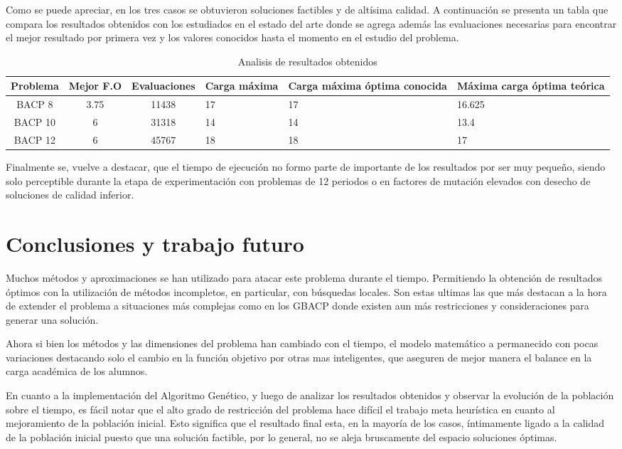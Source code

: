 \documentclass[letter, 10pt]{article}
\begin{document}
Como se puede apreciar, en los tres casos se obtuvieron soluciones factibles y
de altísima calidad.  A continuación se presenta un tabla que compara los resultados
obtenidos con los estudiados en el estado del arte donde se agrega además las
evaluaciones necesarias para encontrar el mejor resultado por primera vez y los
valores conocidos hasta el momento en el estudio del problema.


\begin{table}[h]
\centering
\caption{Analisis de resultados obtenidos}
\begin{tabular}{|c|c|c|p{2cm}|p{2cm}|p{2cm}|}
\hline 
Problema & Mejor F.O & Evaluaciones  & Carga máxima & Carga máxima óptima conocida & Máxima carga óptima teórica\tabularnewline
\hline 
\hline 
BACP 8 & 3.75 & 11438 & 17 & 17 & 16.625\tabularnewline
\hline 
BACP 10 & 6 & 31318 & 14 & 14 & 13.4\tabularnewline
\hline 
BACP 12 & 6 & 45767 & 18 & 18 & 17\tabularnewline
\hline
\end{tabular}
\end{table}

Finalmente se, vuelve a destacar, que el tiempo de ejecución no formo
parte de importante de los resultados por ser muy pequeño, siendo solo
perceptible durante la etapa de experimentación con problemas de 12
periodos o en factores de mutación elevados con desecho de soluciones
de calidad inferior.


\section{Conclusiones y trabajo futuro}
Muchos métodos y aproximaciones se han utilizado para atacar este
problema durante el tiempo. Permitiendo la obtención de resultados
óptimos con la utilización de métodos incompletos, en particular, con
búsquedas locales. Son estas ultimas las que más destacan a la hora de
extender el problema a situaciones más complejas como en los GBACP
donde existen aun más restricciones y consideraciones para generar una
solución.

Ahora si bien los métodos y las dimensiones del problema han cambiado
con el tiempo, el modelo matemático a permanecido con pocas
variaciones destacando solo el cambio en la función objetivo por otras
mas inteligentes, que aseguren de mejor manera el balance en la carga
académica de los alumnos.


En cuanto a la implementación del Algoritmo Genético, y luego de
analizar los resultados obtenidos y observar la evolución de la
población sobre el tiempo, es fácil notar que el alto grado de
restricción del problema hace difícil el trabajo meta heurística en
cuanto al mejoramiento de la población inicial.  Esto significa que el
resultado final esta, en la mayoría de los casos, íntimamente ligado a
la calidad de la población inicial puesto que una solución factible, por
lo general, no se aleja bruscamente del espacio soluciones óptimas.
\end{document}
